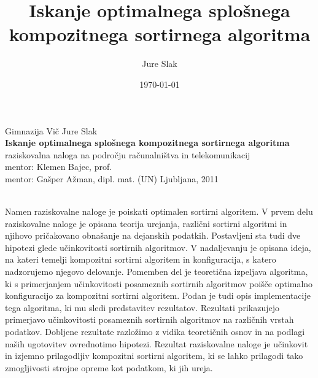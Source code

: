 \documentclass[a4paper,oneside,12pt]{article}
\title{Iskanje optimalnega splošnega kompozitnega sortirnega algoritma}
\author{Jure Slak}
\date{\today}
\begin{document}
\renewcommand{\listfigurename}{Kazalo slik} 
\renewcommand{\listtablename}{Kazalo tabel} 
\renewcommand{\listalgorithmname}{Kazalo algoritmov}

\addto\captionsslovene { %
\renewcommand\bibname{} %
}
\renewcommand\refname{}


\thispagestyle{empty}

\begin{center}{\large
  Gimnazija Vič
  \vfill
  {\Large Jure Slak}\\[20mm]
  {\bf \huge Iskanje optimalnega splošnega kompozitnega sortirnega algoritma}\\[10mm]
  raziskovalna naloga na področju računalništva in telekomunikacij\\[1cm]
  mentor: Klemen Bajec, prof.  \\[2mm]
  mentor: Gašper Ažman, dipl. mat. (UN)}
  \vfill
  \vfill
  {\large Ljubljana, 2011}
\end{center}
\pagebreak

\\[5mm]
Namen raziskovalne naloge je poiskati optimalen sortirni algoritem.
V prvem delu raziskovalne naloge je opisana teorija urejanja, različni sortirni
algoritmi in njihovo pričakovano obnašanje na dejanskih podatkih. Postavljeni sta tudi dve 
hipotezi glede učinkovitosti sortirnih algoritmov. 
V nadaljevanju je opisana ideja, na
kateri temelji kompozitni sortirni algoritem in konfiguracija, s katero nadzorujemo
njegovo delovanje. Pomemben del je teoretična izpeljava
algoritma, ki s primerjanjem učinkovitosti posameznih sortirnih algoritmov poišče
optimalno konfiguracijo za kompozitni sortirni algoritem. Podan je tudi opis 
implementacije tega algoritma, ki mu sledi 
predstavitev rezultatov. Rezultati prikazujejo primerjavo učinkovitosti posameznih 
sortirnih algoritmov na različnih vrstah podatkov. 
Dobljene rezultate razložimo z vidika teoretičnih osnov in na podlagi naših ugotovitev 
ovrednotimo hipotezi. Rezultat raziskovalne naloge je učinkovit in izjemno prilagodljiv
kompozitni sortirni algoritem, ki se lahko prilagodi tako zmogljivosti strojne opreme
kot podatkom, ki jih ureja.

\vfill
\end{document}

